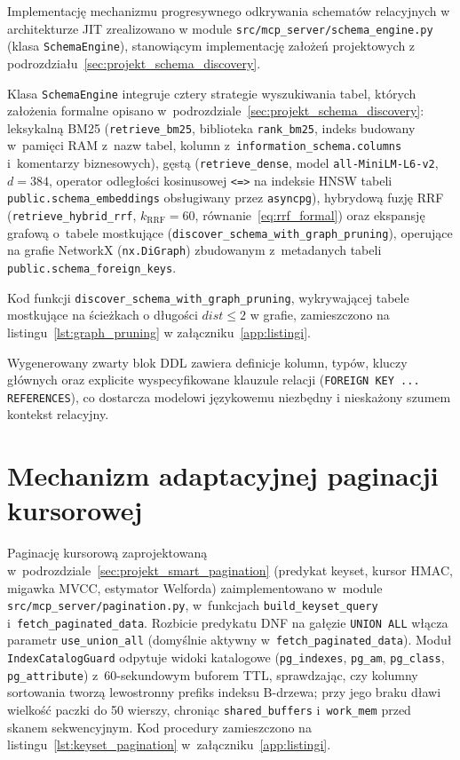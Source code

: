 Implementację mechanizmu progresywnego odkrywania schematów relacyjnych w architekturze JIT zrealizowano w module \texttt{src/mcp\_server/schema\_engine.py} (klasa \texttt{SchemaEngine}), stanowiącym implementację założeń projektowych z podrozdziału~\ref{sec:projekt_schema_discovery}.

Klasa \texttt{SchemaEngine} integruje cztery strategie wyszukiwania tabel, których założenia formalne opisano w~podrozdziale~\ref{sec:projekt_schema_discovery}: leksykalną BM25 (\texttt{retrieve\_bm25}, biblioteka \texttt{rank\_bm25}, indeks budowany w~pamięci RAM z~nazw tabel, kolumn z~\texttt{information\_schema.columns} i~komentarzy biznesowych), gęstą (\texttt{retrieve\_dense}, model \texttt{all-MiniLM-L6-v2}, $d=384$, operator odległości kosinusowej \texttt{<=>} na indeksie HNSW tabeli \texttt{public.schema\_embeddings} obsługiwany przez \texttt{asyncpg}), hybrydową fuzję RRF (\texttt{retrieve\_hybrid\_rrf}, $k_{\text{RRF}} = 60$, równanie~\eqref{eq:rrf_formal}) oraz ekspansję grafową o~tabele mostkujące (\texttt{discover\_schema\_with\_graph\_pruning}), operujące na grafie NetworkX (\texttt{nx.DiGraph}) zbudowanym z~metadanych tabeli \texttt{public.schema\_foreign\_keys}.

Kod funkcji \texttt{discover\_schema\_with\_graph\_pruning}, wykrywającej tabele mostkujące na ścieżkach o długości $dist \le 2$ w grafie, zamieszczono na listingu~\ref{lst:graph_pruning} w załączniku~\ref{app:listingi}.

Wygenerowany zwarty blok DDL zawiera definicje kolumn, typów, kluczy głównych oraz explicite wyspecyfikowane klauzule relacji (\texttt{FOREIGN KEY ... REFERENCES}), co dostarcza modelowi językowemu niezbędny i nieskażony szumem kontekst relacyjny.


\section{Mechanizm adaptacyjnej paginacji kursorowej}
\label{sec:smart_pagination}

Paginację kursorową zaprojektowaną w~podrozdziale~\ref{sec:projekt_smart_pagination} (predykat keyset, kursor HMAC, migawka MVCC, estymator Welforda) zaimplementowano w~module \texttt{src/mcp\_server/pagination.py}, w~funkcjach \texttt{build\_keyset\_query} i~\texttt{fetch\_paginated\_data}. Rozbicie predykatu DNF na gałęzie \texttt{UNION ALL} włącza parametr \texttt{use\_union\_all} (domyślnie aktywny w~\texttt{fetch\_paginated\_data}). Moduł \texttt{IndexCatalogGuard} odpytuje widoki katalogowe (\texttt{pg\_indexes}, \texttt{pg\_am}, \texttt{pg\_class}, \texttt{pg\_attribute}) z~60-sekundowym buforem TTL, sprawdzając, czy kolumny sortowania tworzą lewostronny prefiks indeksu B-drzewa; przy jego braku dławi wielkość paczki do 50 wierszy, chroniąc \texttt{shared\_buffers} i~\texttt{work\_mem} przed skanem sekwencyjnym. Kod procedury zamieszczono na listingu~\ref{lst:keyset_pagination} w~załączniku~\ref{app:listingi}.


